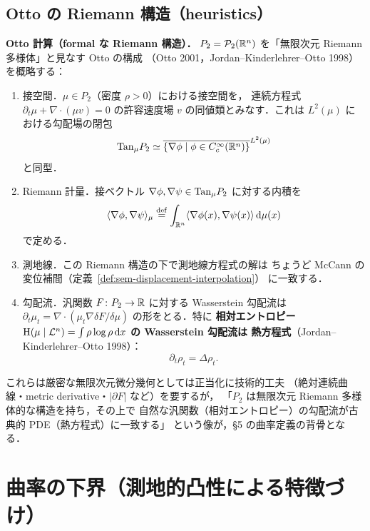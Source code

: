 \subsection{Otto の Riemann 構造（heuristics）}

\begin{memo*}
  \textbf{Otto 計算（formal な Riemann 構造）．}
  $P_2 = \mathcal{P}_2(\mathbb{R}^n)$ を「無限次元 Riemann 多様体」と見なす Otto の構成
  （Otto 2001，Jordan--Kinderlehrer--Otto 1998）を概略する：
  \begin{enumerate}
    \item[\textup{(i)}] 接空間．$\mu \in P_2$（密度 $\rho > 0$）における接空間を，
      連続方程式 $\partial_t \mu + \nabla \cdot (\mu v) = 0$ の許容速度場 $v$
      の同値類とみなす．これは $L^2(\mu)$ における勾配場の閉包
      \[
        \mathrm{Tan}_\mu P_2
        \simeq \overline{\{\nabla \phi \mid \phi \in C^\infty_c(\mathbb{R}^n)\}}^{L^2(\mu)}
      \]
      と同型．
    \item[\textup{(ii)}] Riemann 計量．接ベクトル
      $\nabla \phi, \nabla \psi \in \mathrm{Tan}_\mu P_2$ に対する内積を
      \[
        \langle \nabla \phi, \nabla \psi \rangle_\mu
        \overset{\mathrm{def}}{=} \int_{\mathbb{R}^n} \langle \nabla \phi(x), \nabla \psi(x) \rangle \, \mathrm{d}\mu(x)
      \]
      で定める．
    \item[\textup{(iii)}] 測地線．この Riemann 構造の下で測地線方程式の解は
      ちょうど McCann の変位補間（定義~\ref{def:sem-displacement-interpolation}）
      に一致する．
    \item[\textup{(iv)}] 勾配流．汎関数 $F \colon P_2 \to \mathbb{R}$ に対する
      Wasserstein 勾配流は $\partial_t \mu_t = \nabla \cdot (\mu_t \nabla \delta F / \delta \mu)$
      の形をとる．特に \textbf{相対エントロピー
      $\mathrm{H}(\mu \mid \mathcal{L}^n) = \int \rho \log \rho \, \mathrm{d} x$ の Wasserstein 勾配流は
      熱方程式}（Jordan--Kinderlehrer--Otto 1998）：
      \[
        \partial_t \rho_t = \Delta \rho_t.
      \]
  \end{enumerate}
  これらは厳密な無限次元微分幾何としては正当化に技術的工夫
  （絶対連続曲線・metric derivative・$|\partial F|$ など）を要するが，
  「$P_2$ は無限次元 Riemann 多様体的な構造を持ち，その上で
  自然な汎関数（相対エントロピー）の勾配流が古典的 PDE（熱方程式）に一致する」
  という像が，§5 の曲率定義の背骨となる．
\end{memo*}

\section{曲率の下界（測地的凸性による特徴づけ）}
\label{sec:sem-curvature}

